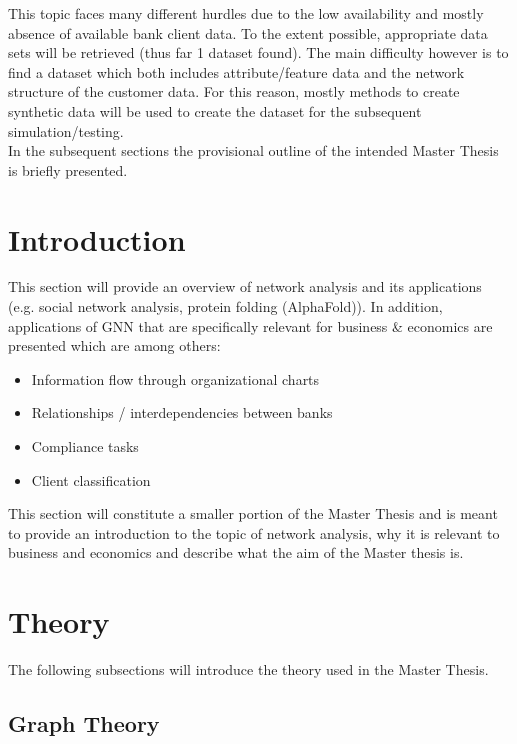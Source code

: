 \documentclass[12pt,a4paper]{article}
\begin{document}
	\noindent This topic faces many different hurdles due to the low availability and mostly absence of available bank client data. To the extent 
	possible, appropriate data sets will be retrieved (thus far 1 dataset found). The main difficulty however is to find a dataset which both includes 
	attribute/feature data and the network structure of the customer data. For this reason, mostly methods to create synthetic data will be used to 
	create the dataset for the subsequent simulation/testing. \\

	\noindent In the subsequent sections the provisional outline of the intended Master Thesis is briefly presented. 
	
	\section{Introduction}

	This section will provide an overview of network analysis and its applications (e.g. social network analysis, protein folding (AlphaFold)). 
	In addition, applications of GNN that are specifically relevant for business \& economics are presented which are among others:	
	
	\begin{itemize}
		\itemsep-0.5em
		\item Information flow through organizational charts
		\item Relationships / interdependencies between banks
		\item Compliance tasks 
		\item Client classification
	\end{itemize}
	
	\noindent This section will constitute a smaller portion of the Master Thesis and is meant to provide an introduction to the topic of network 
	analysis, why it is relevant to business and economics and describe what the aim of the Master thesis is.

	\section{Theory}
	
	The following subsections will introduce the theory used in the Master Thesis.

	\subsection{Graph Theory}
\end{document}

